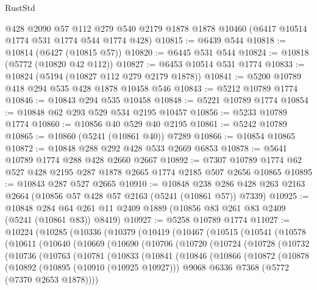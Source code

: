\begin{lexlean}{RustStd}
\begin{coremodule}
{\begin{coremodule}
{{{{{{{{{{{{{{{{{{{{{{{{{{{{{    @428
    @2090
    @57
    @112
    @279
    @540
    @2179
    @1878
    @1878
    @10460
    (@6417 @10514 @1774 @531 @1774 @544 @1774 @428)
@10815 := @6439 @544
@10818 := @10814 (@6427 (@10815 @57))
@10820 := @6445 @531 @544
@10824 := @10818 (@5772 (@10820 @42 @112))
@10827 := @6453 @10514 @531 @1774
@10833 := @10824 (@5194 (@10827 @112 @279 @2179 @1878))
@10841 := @5200 @10789 @418 @294 @535 @428 @1878 @10458 @546
@10843 := @5212 @10789 @1774
@10846 := @10843 @294 @535 @10458
@10848 := @5221 @10789 @1774
@10854 := @10848 @62 @293 @529 @534 @2195 @10457
@10856 := @5233 @10789 @1774
@10860 := @10856 @40 @529 @40 @2195
@10861 := @5242 @10789
@10865 := @10860 (@5241 (@10861 @40)) @7289
@10866 := @10854 @10865
@10872 := @10848 @288 @292 @428 @533 @2669 @6853
@10878 := @5641 @10789 @1774 @288 @428 @2660 @2667
@10892 := @7307 @10789 @1774 @62 @527 @428 @2195 @287 @1878 @2665 @1774 @2185 @507 @2656 @10865
@10895 := @10843 @287 @527 @2665
@10910 := @10848
    @238
    @286
    @428
    @263
    @2163
    @2664
    (@10856 @57 @428 @57 @2163 (@5241 (@10861 @57)) @7339)
@10925 := @10848
    @284
    @64
    @261
    @11
    @2409
    @1889
    (@10856 @83 @261 @83 @2409 (@5241 (@10861 @83)) @8419)
@10927 := @5258 @10789 @1774
@11027 := @10224
    (@10285
      (@10336
        (@10379
          (@10419
            (@10467
              (@10515
                (@10541
                  (@10578
                    (@10611
                      (@10640
                        (@10669
                          (@10690
                            (@10706
                              (@10720
                                (@10724
                                  (@10728
                                    (@10732
                                      (@10736
                                        (@10763
                                          (@10781
                                            (@10833
                                              (@10841
                                                (@10846
                                                  (@10866
                                                    (@10872
                                                      (@10878
                                                        (@10892
                                                          (@10895 (@10910 (@10925 @10927)))
                                                          @9068
                                                          @6336
                                                          @7368
                                                          (@5772 (@7370 @2653 @1878))))
}}}}}}}}}}}}}}}}}}}}}}}}}}}}}
\end{coremodule}}
\end{coremodule}
\end{lexlean}
